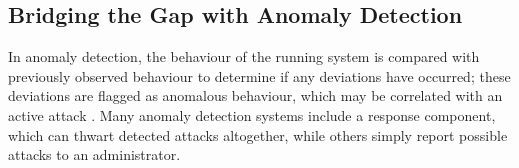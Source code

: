 \documentclass[dvipsnames, 12pt]{article}
\newcommand{\kimmbox}{\textsc{Mbox}}
\begin{document}

\subsection{Bridging the Gap with Anomaly Detection}

In anomaly detection, the behaviour of the running system is compared with
previously observed behaviour to determine if any deviations have occurred;
these deviations are flagged as anomalous behaviour, which may be correlated
with an active attack \cite{forrest2008_evolution}. Many anomaly detection
systems include a response component, which can thwart detected attacks
altogether, while others simply report possible attacks to an administrator.
\end{document}
